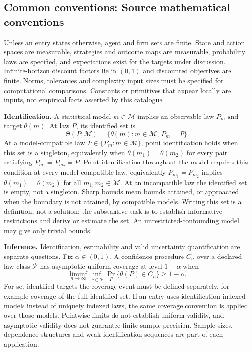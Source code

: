 \documentclass[11pt,a4paper]{article}
\begin{document}
\subsection*{Common conventions: Source mathematical conventions}

Unless an entry states otherwise, agent and firm sets are finite. State and action spaces are measurable, strategies and outcome maps are measurable, probability laws are specified, and expectations exist for the targets under discussion. Infinite-horizon discount factors lie in $(0,1)$ and discounted objectives are finite. Norms, tolerances and complexity input sizes must be specified for computational comparisons. Constants or primitives that appear locally are inputs, not empirical facts asserted by this catalogue.

\textbf{Identification.} A statistical model $m\in\mathcal M$ implies an observable law $P_m$ and target $\theta(m)$. At law $P$, its identified set is
\[
\Theta(P;\mathcal M)=\{\theta(m):m\in\mathcal M,\ P_m=P\}.
\]
At a model-compatible law $P\in\{P_m:m\in\mathcal M\}$, point identification holds when this set is a singleton, equivalently when $\theta(m_1)=\theta(m_2)$ for every pair satisfying $P_{m_1}=P_{m_2}=P$. Point identification throughout the model requires this condition at every model-compatible law, equivalently $P_{m_1}=P_{m_2}$ implies $\theta(m_1)=\theta(m_2)$ for all $m_1,m_2\in\mathcal M$. At an incompatible law the identified set is empty, not a singleton. Sharp bounds mean bounds attained, or approached when the boundary is not attained, by compatible models. Writing this set is a definition, not a solution: the substantive task is to establish informative restrictions and derive or estimate the set. An unrestricted-confounding model may give only trivial bounds.

\textbf{Inference.} Identification, estimability and valid uncertainty quantification are separate questions. Fix $\alpha\in(0,1)$. A confidence procedure $C_n$ over a declared law class $\mathcal P$ has asymptotic uniform coverage at level $1-\alpha$ when
\[
\liminf_{n\to\infty}\inf_{P\in\mathcal P}\Pr_P\{\theta(P)\in C_n\}\geq1-\alpha.
\]
For set-identified targets the coverage event must be defined separately, for example coverage of the full identified set. If an entry uses identification-indexed models instead of uniquely indexed laws, the same coverage convention is applied over those models. Pointwise limits do not establish uniform validity, and asymptotic validity does not guarantee finite-sample precision. Sample sizes, dependence structures and weak-identification sequences are part of each application.
\end{document}
